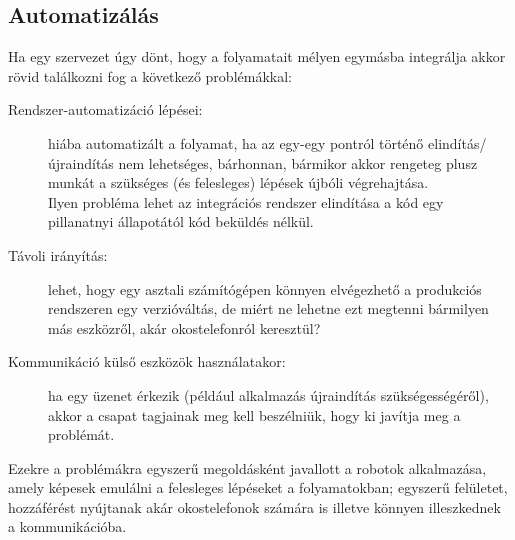 \subsection{Automatizálás}
\label{subsec:automating}
Ha egy szervezet úgy dönt, hogy a folyamatait mélyen egymásba integrálja akkor rövid találkozni fog a következő problémákkal:
\begin{description}
\item[Rendszer-automatizáció lépései:] hiába automatizált a folyamat, ha az egy-egy pontról történő elindítás/újraindítás nem lehetséges, bárhonnan, bármikor akkor rengeteg plusz munkát a szükséges (és felesleges) lépések újbóli végrehajtása.\\
Ilyen probléma lehet az integrációs rendszer elindítása a kód egy pillanatnyi állapotától kód beküldés nélkül.
\item[Távoli irányítás:] lehet, hogy egy asztali számítógépen könnyen elvégezhető a produkciós rendszeren egy verzióváltás, de miért ne lehetne ezt megtenni bármilyen más eszközről, akár okostelefonról keresztül?
\item[Kommunikáció külső eszközök használatakor:] ha egy üzenet érkezik (például alkalmazás újraindítás szükségességéről), akkor a csapat tagjainak meg kell beszélniük, hogy ki javítja meg a problémát.
\end{description}

Ezekre a problémákra egyszerű megoldásként javallott a robotok alkalmazása, amely képesek emulálni a felesleges lépéseket a folyamatokban; egyszerű felületet, hozzáférést nyújtanak akár okostelefonok számára is illetve könnyen illeszkednek a kommunikációba.

